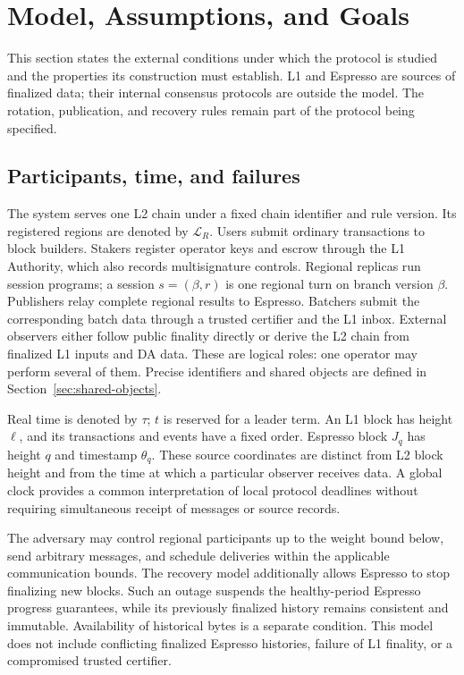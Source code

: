 \section{Model, Assumptions, and Goals}
\label{sec:model}

This section states the external conditions under which the protocol is
studied and the properties its construction must establish.  L1 and
Espresso are sources of finalized data; their internal consensus
protocols are outside the model.  The rotation, publication, and recovery
rules remain part of the protocol being specified.

\subsection{Participants, time, and failures}
\label{sec:model-participants}

The system serves one L2 chain under a fixed chain identifier and rule
version.  Its registered regions are denoted by $\mathcal L_R$.  Users
submit ordinary transactions to block builders.  Stakers register
operator keys and escrow through the L1 Authority, which also records
multisignature controls.  Regional replicas run session programs; a
session $s=(\beta,r)$ is one regional turn on branch version $\beta$.
Publishers relay complete regional results to Espresso.  Batchers submit
the corresponding batch data through a trusted certifier and the L1
inbox.  External observers either follow public finality directly or
derive the L2 chain from finalized L1 inputs and DA data.  These are
logical roles: one operator may perform several of them.  Precise
identifiers and shared objects are defined in
Section~\ref{sec:shared-objects}.

Real time is denoted by $\tau$; $t$ is reserved for a leader term.  An L1
block has height $\ell$, and its transactions and events have a fixed
order.  Espresso block $J_q$ has height $q$ and timestamp $\theta_q$.
These source coordinates are distinct from L2 block height and from the
time at which a particular observer receives data.  A global clock
provides a common interpretation of local protocol deadlines without
requiring simultaneous receipt of messages or source records.

The adversary may control regional participants up to the weight bound
below, send arbitrary messages, and schedule deliveries within the
applicable communication bounds.  The recovery model additionally
allows Espresso to stop finalizing new blocks.  Such an outage suspends
the healthy-period Espresso progress guarantees, while its previously
finalized history remains consistent and immutable.  Availability of
historical bytes is a separate condition.  This model does not include
conflicting finalized Espresso histories, failure of L1 finality, or a
compromised trusted certifier.

